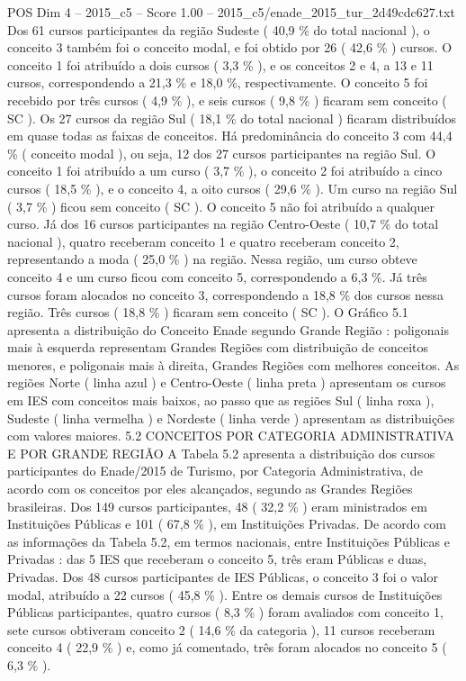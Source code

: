 \begin{textsample}{POS Dim 4 – 2015\_c5 – Score 1.00 – 2015\_c5/enade\_2015\_tur\_2d49cdc627.txt}
Dos 61 cursos participantes da região Sudeste ( 40,9 \% do total nacional ), o conceito 3 também foi o conceito modal, e foi obtido por 26 ( 42,6 \% ) cursos.
O conceito 1 foi atribuído a dois cursos ( 3,3 \% ), e os conceitos 2 e 4, a 13 e 11 cursos, correspondendo a 21,3 \% e 18,0 \%, respectivamente.
O conceito 5 foi recebido por três cursos ( 4,9 \% ), e seis cursos ( 9,8 \% ) ficaram sem conceito ( SC ).
Os 27 cursos da região Sul ( 18,1 \% do total nacional ) ficaram distribuídos em quase todas as faixas de conceitos.
Há predominância do conceito 3 com 44,4 \% ( conceito modal ), ou seja, 12 dos 27 cursos participantes na região Sul.
O conceito 1 foi atribuído a um curso ( 3,7 \% ), o conceito 2 foi atribuído a cinco cursos ( 18,5 \% ), e o conceito 4, a oito cursos ( 29,6 \% ).
Um curso na região Sul ( 3,7 \% ) ficou sem conceito ( SC ).
O conceito 5 não foi atribuído a qualquer curso.
Já dos 16 cursos participantes na região Centro-Oeste ( 10,7 \% do total nacional ), quatro receberam conceito 1 e quatro receberam conceito 2, representando a moda ( 25,0 \% ) na região.
Nessa região, um curso obteve conceito 4 e um curso ficou com conceito 5, correspondendo a 6,3 \%.
Já três cursos foram alocados no conceito 3, correspondendo a 18,8 \% dos cursos nessa região.
Três cursos ( 18,8 \% ) ficaram sem conceito ( SC ).
O Gráfico 5.1 apresenta a distribuição do Conceito Enade segundo Grande Região : poligonais mais à esquerda representam Grandes Regiões com distribuição de conceitos menores, e poligonais mais à direita, Grandes Regiões com melhores conceitos.
As regiões Norte ( linha azul ) e Centro-Oeste ( linha preta ) apresentam os cursos em IES com conceitos mais baixos, ao passo que as regiões Sul ( linha roxa ), Sudeste ( linha vermelha ) e Nordeste ( linha verde ) apresentam as distribuições com valores maiores. 5.2 CONCEITOS POR CATEGORIA ADMINISTRATIVA E POR GRANDE REGIÃO A Tabela 5.2 apresenta a distribuição dos cursos participantes do Enade/2015 de Turismo, por Categoria Administrativa, de acordo com os conceitos por eles alcançados, segundo as Grandes Regiões brasileiras.
Dos 149 cursos participantes, 48 ( 32,2 \% ) eram ministrados em Instituições Públicas e 101 ( 67,8 \% ), em Instituições Privadas.
De acordo com as informações da Tabela 5.2, em termos nacionais, entre Instituições Públicas e Privadas : das 5 IES que receberam o conceito 5, três eram Públicas e duas, Privadas.
Dos 48 cursos participantes de IES Públicas, o conceito 3 foi o valor modal, atribuído a 22 cursos ( 45,8 \% ).
Entre os demais cursos de Instituições Públicas participantes, quatro cursos ( 8,3 \% ) foram avaliados com conceito 1, sete cursos obtiveram conceito 2 ( 14,6 \% da categoria ), 11 cursos receberam conceito 4 ( 22,9 \% ) e, como já comentado, três foram alocados no conceito 5 ( 6,3 \% ).

\end{textsample}
